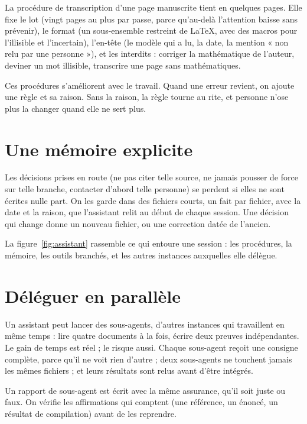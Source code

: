 \begin{exemple}
La procédure de transcription d'une page manuscrite tient en quelques pages. Elle fixe le
lot (vingt pages au plus par passe, parce qu'au-delà l'attention baisse sans prévenir), le
format (un sous-ensemble restreint de LaTeX, avec des macros pour l'illisible et
l'incertain), l'en-tête (le modèle qui a lu, la date, la mention « non relu par une
personne »), et les interdits : corriger la mathématique de l'auteur, deviner un mot
illisible, transcrire une page sans mathématiques.
\end{exemple}

Ces procédures s'améliorent avec le travail. Quand une erreur revient, on ajoute une règle
et sa raison. Sans la raison, la règle tourne au rite, et personne n'ose plus la changer
quand elle ne sert plus.

\section{Une mémoire explicite}

Les décisions prises en route (ne pas citer telle source, ne jamais pousser de force sur
telle branche, contacter d'abord telle personne) se perdent si elles ne sont écrites nulle
part. On les garde dans des fichiers courts, un fait par fichier, avec la date et la raison,
que l'assistant relit au début de chaque session. Une décision qui change donne un nouveau
fichier, ou une correction datée de l'ancien.

La figure~\ref{fig:assistant} rassemble ce qui entoure une session : les procédures, la
mémoire, les outils branchés, et les autres instances auxquelles elle délègue.



\section{Déléguer en parallèle}

Un assistant peut lancer des sous-agents, d'autres instances qui travaillent en même
temps : lire quatre documents à la fois, écrire deux preuves indépendantes. Le gain de temps
est réel ; le risque aussi. Chaque sous-agent reçoit une consigne complète, parce qu'il ne
voit rien d'autre ; deux sous-agents ne touchent jamais les mêmes fichiers ; et leurs
résultats sont relus avant d'être intégrés.

\begin{warningblock}
Un rapport de sous-agent est écrit avec la même assurance, qu'il soit juste ou faux. On
vérifie les affirmations qui comptent (une référence, un énoncé, un résultat de
compilation) avant de les reprendre.
\end{warningblock}

